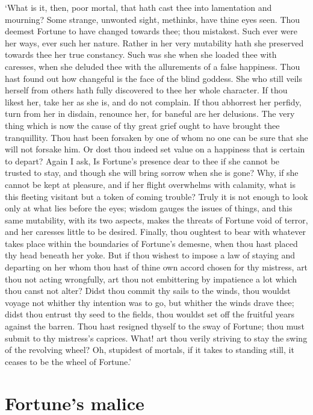 \documentclass[12pt]{book}
\begin{document}
`What is it, then, poor mortal, that hath cast thee into lamentation and
mourning? Some strange, unwonted sight, methinks, have thine eyes seen.
Thou deemest Fortune to have changed towards thee; thou mistakest. Such
ever were her ways, ever such her nature. Rather in her very mutability
hath she preserved towards thee her true constancy. Such was she when
she loaded thee with caresses, when she deluded thee with the
allurements of a false happiness. Thou hast found out how changeful is
the face of the blind goddess. She who still veils herself from others
hath fully discovered to thee her whole character. If thou likest her,
take her as she is, and do not complain. If thou abhorrest her perfidy,
turn from her in disdain, renounce her, for baneful are her delusions.
The very thing which is now the cause of thy great grief ought to have
brought thee tranquillity. Thou hast been forsaken by one of whom no one
can be sure that she will not forsake him. Or dost thou indeed set value
on a happiness that is certain to depart? Again I ask, Is Fortune's
presence dear to thee if she cannot be trusted to stay, and though she
will bring sorrow when she is gone? Why, if she cannot be kept at
pleasure, and if her flight overwhelms with calamity, what is this
fleeting visitant but a token of coming trouble? Truly it is not enough
to look only at what lies before the eyes; wisdom gauges the issues of
things, and this same mutability, with its two aspects, makes the
threats of Fortune void of terror, and her caresses little to be
desired. Finally, thou oughtest to bear with whatever takes place within
the boundaries of Fortune's demesne, when thou hast placed thy head
beneath her yoke. But if thou wishest to impose a law of staying and
departing on her whom thou hast of thine own accord chosen for thy
mistress, art thou not acting wrongfully, art thou not embittering by
impatience a lot which thou canst not alter? Didst thou commit thy sails
to the winds, thou wouldst voyage not whither thy intention was to go,
but whither the winds drave thee; didst thou entrust thy seed to the
fields, thou wouldst set off the fruitful years against the barren. Thou
hast resigned thyself to the sway of Fortune; thou must submit to thy
mistress's caprices. What! art thou verily striving to stay the swing
of the revolving wheel? Oh, stupidest of mortals, if it takes to
standing still, it ceases to be the wheel of Fortune.'


\section{Fortune's malice}
\end{document}
